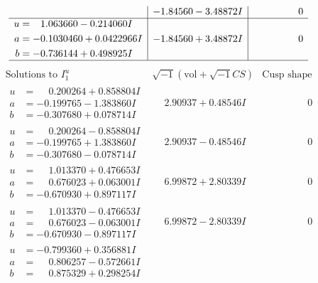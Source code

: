\documentclass[1p]{elsarticle_modified}
\theoremstyle{definition}
\newcommand{\I}{\sqrt{-1}}
\begin{document}
$$\begin{array}{c|c|c}
 & -1.84560 - 3.48872 I & \phantom{-0.000000 } 0 \\ \hline\begin{aligned}
u &= \phantom{-}1.063660 - 0.214060 I \\
a &= -0.1030460 + 0.0422966 I \\
b &= -0.736144 + 0.498925 I\end{aligned}
 & -1.84560 + 3.48872 I & \phantom{-0.000000 } 0\\
 \hline 
 \end{array}$$\newpage$$\begin{array}{c|c|c}  
\text{Solutions to }I^u_{1}& \I (\text{vol} + \sqrt{-1}CS) & \text{Cusp shape}\\
 \hline 
\begin{aligned}
u &= \phantom{-}0.200264 + 0.858804 I \\
a &= -0.199765 - 1.383860 I \\
b &= -0.307680 + 0.078714 I\end{aligned}
 & \phantom{-}2.90937 + 0.48546 I & \phantom{-0.000000 } 0 \\ \hline\begin{aligned}
u &= \phantom{-}0.200264 - 0.858804 I \\
a &= -0.199765 + 1.383860 I \\
b &= -0.307680 - 0.078714 I\end{aligned}
 & \phantom{-}2.90937 - 0.48546 I & \phantom{-0.000000 } 0 \\ \hline\begin{aligned}
u &= \phantom{-}1.013370 + 0.476653 I \\
a &= \phantom{-}0.676023 + 0.063001 I \\
b &= -0.670930 + 0.897117 I\end{aligned}
 & \phantom{-}6.99872 + 2.80339 I & \phantom{-0.000000 } 0 \\ \hline\begin{aligned}
u &= \phantom{-}1.013370 - 0.476653 I \\
a &= \phantom{-}0.676023 - 0.063001 I \\
b &= -0.670930 - 0.897117 I\end{aligned}
 & \phantom{-}6.99872 - 2.80339 I & \phantom{-0.000000 } 0 \\ \hline\begin{aligned}
u &= -0.799360 + 0.356881 I \\
a &= \phantom{-}0.806257 - 0.572661 I \\
b &= \phantom{-}0.875329 + 0.298254 I\end{aligned}

\end{array}$$
\end{document}
